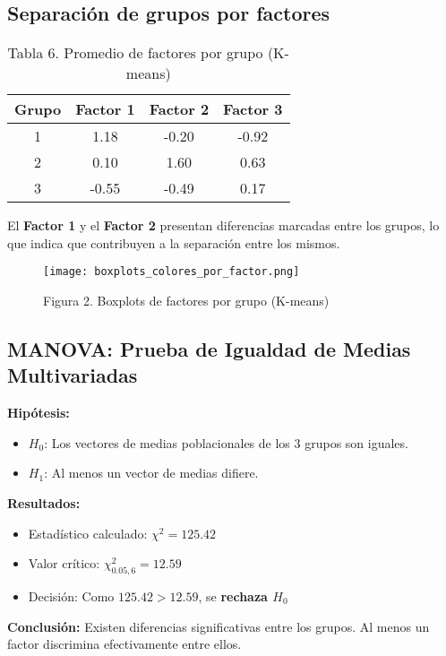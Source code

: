 \documentclass[12pt]{report}
\begin{document}
\subsection{Separación de grupos por factores}
\begin{table}[H]
\centering
\begin{tabular}{|c|c|c|c|}
\hline
\textbf{Grupo} & \textbf{Factor 1} & \textbf{Factor 2} & \textbf{Factor 3} \\
\hline
1 & 1.18 & -0.20 & -0.92 \\
2 & 0.10 &  1.60 &  0.63 \\
3 & -0.55 & -0.49 &  0.17 \\
\hline
\end{tabular}
\caption{Tabla 6. Promedio de factores por grupo (K-means)}
\end{table}

\noindent El \textbf{Factor 1} y el \textbf{Factor 2} presentan diferencias marcadas entre los grupos, lo que indica que contribuyen a la separación entre los mismos.

\begin{figure}[H]
    \centering
    \texttt{[image: boxplots\_colores\_por\_factor.png]}
    \caption{Figura 2. Boxplots de factores por grupo (K-means)}
\end{figure}

\subsection{MANOVA: Prueba de Igualdad de Medias Multivariadas}
\textbf{Hipótesis:}
\begin{itemize}
    \item $H_0$: Los vectores de medias poblacionales de los 3 grupos son iguales.
    \item $H_1$: Al menos un vector de medias difiere.
\end{itemize}

\textbf{Resultados:}
\begin{itemize}
    \item Estadístico calculado: $\chi^2 = 125.42$
    \item Valor crítico: $\chi^2_{0.05, 6} = 12.59$
    \item Decisión: Como $125.42 > 12.59$, se \textbf{rechaza $H_0$}
\end{itemize}

\textbf{Conclusión:} Existen diferencias significativas entre los grupos. Al menos un factor discrimina efectivamente entre ellos.
\end{document}
